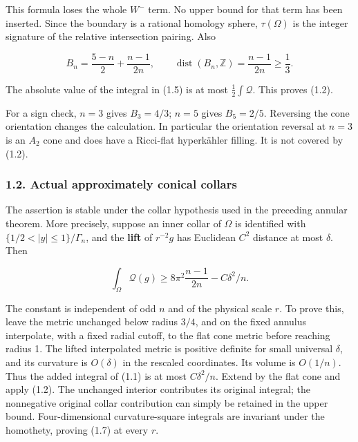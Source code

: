 \documentclass[
  10pt,
]{article}
\begin{document}
This formula loses the whole \(W^-\) term. No upper bound for that term
has been inserted. Since the boundary is a rational homology sphere,
\(\tau(\Omega)\) is the integer signature of the relative intersection
pairing. Also

\[
 B_n=\frac{5-n}{2}+\frac{n-1}{2n},\qquad
 \operatorname{dist}(B_n,\mathbb Z)=\frac{n-1}{2n}\ge\frac13.
                                                        \tag{1.6}
\]

The absolute value of the integral in (1.5) is at most
\(\tfrac12\int\mathscr Q\). This proves (1.2).

For a sign check, \(n=3\) gives \(B_3=4/3\); \(n=5\) gives \(B_5=2/5\).
Reversing the cone orientation changes the calculation. In particular
the orientation reversal at \(n=3\) is an \(A_2\) cone and does have a
Ricci-flat hyperkähler filling. It is not covered by (1.2).

\hypertarget{actual-approximately-conical-collars}{%
\subsubsection{1.2. Actual approximately conical
collars}\label{actual-approximately-conical-collars}}

The assertion is stable under the collar hypothesis used in the
preceding annular theorem. More precisely, suppose an inner collar of
\(\Omega\) is identified with \(\{1/2<|y|\le1\}/\Gamma_n\), and the
\textbf{lift} of \(r^{-2}g\) has Euclidean \(C^2\) distance at most
\(\delta\). Then

\[
 \boxed{\int_\Omega\mathscr Q(g)
          \ge 8\pi^2\frac{n-1}{2n}-C\delta^2/n.}
                                                        \tag{1.7}
\]

The constant is independent of odd \(n\) and of the physical scale
\(r\). To prove this, leave the metric unchanged below radius \(3/4\),
and on the fixed annulus interpolate, with a fixed radial cutoff, to the
flat cone metric before reaching radius 1. The lifted interpolated
metric is positive definite for small universal \(\delta\), and its
curvature is \(O(\delta)\) in the rescaled coordinates. Its volume is
\(O(1/n)\). Thus the added integral of (1.1) is at most \(C\delta^2/n\).
Extend by the flat cone and apply (1.2). The unchanged interior
contributes its original integral; the nonnegative original collar
contribution can simply be retained in the upper bound. Four-dimensional
curvature-square integrals are invariant under the homothety, proving
(1.7) at every \(r\).
\end{document}
